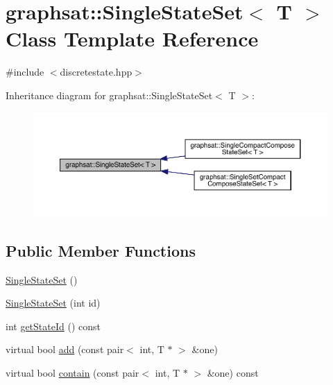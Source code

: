\hypertarget{classgraphsat_1_1_single_state_set}{}\section{graphsat\+::Single\+State\+Set$<$ T $>$ Class Template Reference}
\label{classgraphsat_1_1_single_state_set}


{\ttfamily \#include $<$discretestate.\+hpp$>$}



Inheritance diagram for graphsat\+::Single\+State\+Set$<$ T $>$\+:\nopagebreak
\begin{figure}[H]
\begin{center}
\leavevmode
\includegraphics[width=350pt]{classgraphsat_1_1_single_state_set__inherit__graph}
\end{center}
\end{figure}
\subsection*{Public Member Functions}
\begin{DoxyCompactItemize}
\item 
\mbox{\hyperlink{classgraphsat_1_1_single_state_set_ac6cb2aab41361938e53ea2125c7bc9fa}{Single\+State\+Set}} ()
\item 
\mbox{\hyperlink{classgraphsat_1_1_single_state_set_a0f3b02207b01343d16165273fd3810d3}{Single\+State\+Set}} (int id)
\item 
int \mbox{\hyperlink{classgraphsat_1_1_single_state_set_a98258d528f6b1111de952c5d4d4ab6ee}{get\+State\+Id}} () const
\item 
virtual bool \mbox{\hyperlink{classgraphsat_1_1_single_state_set_a5fb0f789a7429ca9ad94003f4e639570}{add}} (const pair$<$ int, T $\ast$ $>$ \&one)
\item 
virtual bool \mbox{\hyperlink{classgraphsat_1_1_single_state_set_a633187e0b872537595ad313a458b87e1}{contain}} (const pair$<$ int, T $\ast$ $>$ \&one) const
\end{DoxyCompactItemize}
